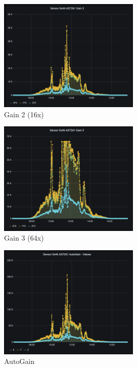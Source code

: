 \begin{figure}[H]
\centering
\includegraphics[width=0.6\textwidth]{img/Grafana-Gain2}
\caption{Gain 2 (16x)}
\label{fig:Grafana_Gain2}
\end{figure}

\begin{figure}[H]
\centering
\includegraphics[width=0.6\textwidth]{img/Grafana-Gain3}
\caption{Gain 3 (64x)}
\label{fig:Grafana_Gain3}
\end{figure}

\begin{figure}[H]
\centering
\includegraphics[width=0.6\textwidth]{img/Grafana-AutoGain}
\caption{AutoGain}
\label{fig:Grafana_AutoGain}
\end{figure}